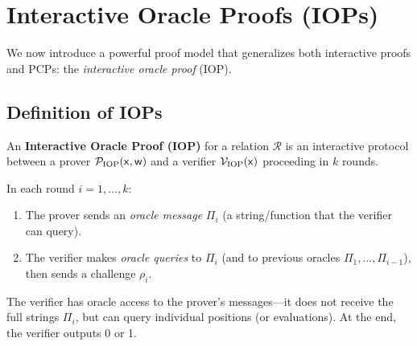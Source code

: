 \documentclass[11pt]{article}
\begin{document}
\section{Interactive Oracle Proofs (IOPs)}

We now introduce a powerful proof model that generalizes both interactive proofs and PCPs: the \emph{interactive oracle proof} (IOP).

\subsection{Definition of IOPs}

\begin{definitionbox}
An \textbf{Interactive Oracle Proof (IOP)} for a relation $\mathcal{R}$ is an interactive protocol between a prover $\mathcal{P}_{\mathrm{IOP}}(\mathsf{x}, \mathsf{w})$ and a verifier $\mathcal{V}_{\mathrm{IOP}}(\mathsf{x})$ proceeding in $k$ rounds.

In each round $i = 1, \ldots, k$:
\begin{enumerate}
  \item The prover sends an \emph{oracle message} $\Pi_i$ (a string/function that the verifier can query).
  \item The verifier makes \emph{oracle queries} to $\Pi_i$ (and to previous oracles $\Pi_1, \ldots, \Pi_{i-1}$), then sends a challenge $\rho_i$.
\end{enumerate}

The verifier has oracle access to the prover's messages---it does not receive the full strings $\Pi_i$, but can query individual positions (or evaluations).  At the end, the verifier outputs 0 or 1.
\end{definitionbox}
\end{document}
